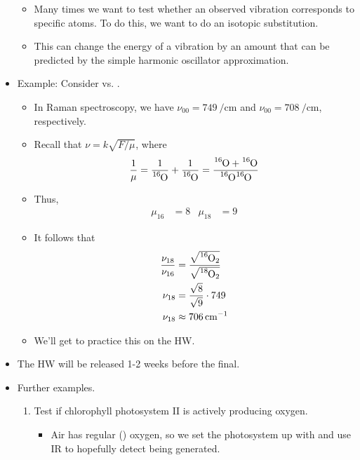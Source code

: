 \documentclass[../notes.tex]{subfiles}
\begin{document}
\begin{itemize}
    \begin{itemize}
        \item Many times we want to test whether an observed vibration corresponds to specific atoms. To do this, we want to do an isotopic substitution.
        \item This can change the energy of a vibration by an amount that can be predicted by the simple harmonic oscillator approximation.
    \end{itemize}
    \item Example: Consider  vs. .
    \begin{itemize}
        \item In Raman spectroscopy, we have $\nu_{00}=\SI{749}{\per\centi\meter}$ and $\nu_{00}=\SI{708}{\per\centi\meter}$, respectively.
        \item Recall that $\nu=k\sqrt{F/\mu}$, where
        \begin{equation*}
            \frac{1}{\mu} = \frac{1}{\ce{{}^16O}}+\frac{1}{\ce{{}^16O}}
            = \frac{\ce{{}^16O}+\ce{{}^16O}}{\ce{{}^16O}\ce{{}^16O}}
        \end{equation*}
        \item Thus,
        \begin{align*}
            \mu_{16} &= 8&
            \mu_{18} &= 9
        \end{align*}
        \item It follows that
        \begin{align*}
            \frac{\nu_{18}}{\nu_{16}} &= \frac{\sqrt{\ce{{}^16O2}}}{\sqrt{\ce{{}^18O2}}}\\
            \nu_{18} &= \frac{\sqrt{8}}{\sqrt{9}}\cdot 749\\
            \nu_{18} &\approx \SI{706}{\per\centi\meter}
        \end{align*}
        \item We'll get to practice this on the HW.
    \end{itemize}
    \item The HW will be released 1-2 weeks before the final.
    \item Further examples.
    \begin{enumerate}
        \item Test if chlorophyll photosystem II is actively producing oxygen.
        \begin{itemize}
            \item Air has regular () oxygen, so we set the photosystem up with  and use IR to hopefully detect  being generated.

\end{itemize}
\end{enumerate}
\end{itemize}
\end{document}
